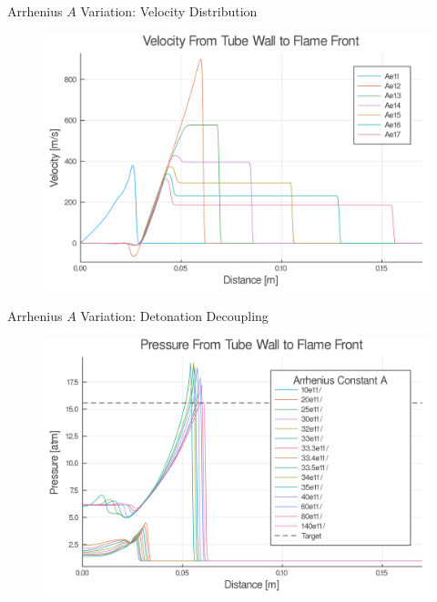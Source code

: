 \begin{frame}{Arrhenius $A$ Variation: Velocity Distribution}
\begin{figure}
\centering
\includegraphics[width=0.8\linewidth]{../figs/Atest/u.png}
\end{figure}
\end{frame}


\begin{frame}{Arrhenius $A$ Variation: Detonation Decoupling}
\begin{figure}
\centering
\includegraphics[width=0.8\linewidth]{../figs/Atest_refined/p_large.png}
\end{figure}
\end{frame}



